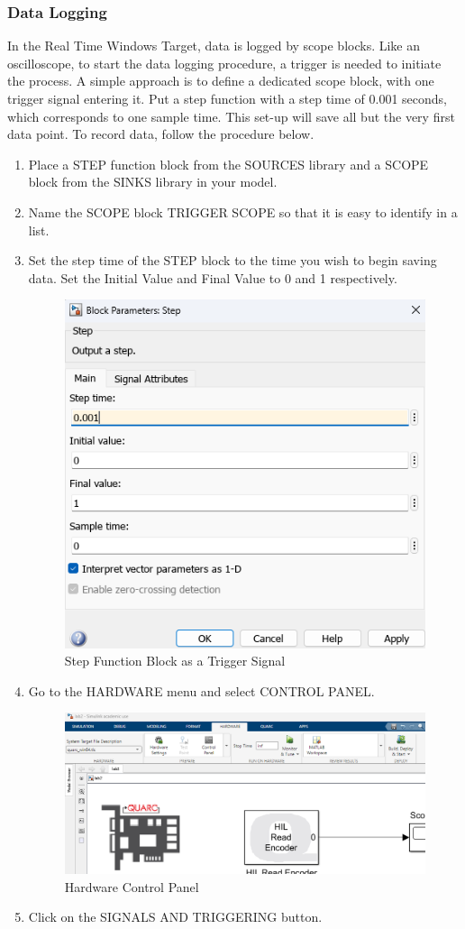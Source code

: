 \documentclass[11pt,letterpaper]{article}
\begin{document}
\subsubsection*{Data Logging}\label{subsubsec:data_logging}
In the Real Time Windows Target, data is logged by scope blocks. Like an oscilloscope, to start the data logging procedure, a trigger is needed to initiate the process. A simple approach is to define a dedicated scope block, with one trigger signal entering it. Put a step function with a step time of 0.001 seconds, which corresponds to one sample time. This set-up will save all but the very first data point. To record data, follow the procedure below.
\begin{enumerate}
  \item Place a STEP function block from the SOURCES library and a SCOPE block from the SINKS library in your model.
  
  \item Name the SCOPE block TRIGGER SCOPE so that it is easy to identify in a list.
  
  \item Set the step time of the STEP block to the time you wish to begin saving data. Set the Initial Value and Final Value to 0 and 1 respectively.
  \begin{figure}[H]
    \centering 
    \includegraphics[width=.7\textwidth]{Figures/fig6_stepfunc.png}
    \caption{Step Function Block as a Trigger Signal}
    \label{fig:step_trigger}
  \end{figure}
  \item Go to the HARDWARE menu and select CONTROL PANEL.
  
  \begin{figure}[H]
    \centering 
    \includegraphics[width=.65\textwidth]{Figures/fig7_ecmpanel.png}
    \caption{Hardware Control Panel}
    \label{fig:emc_panel}
  \end{figure}
  \item Click on the SIGNALS AND TRIGGERING button.
  

\end{enumerate}
\end{document}
